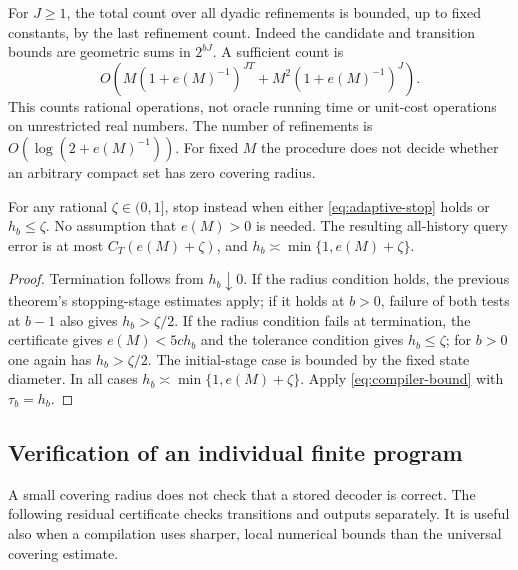 For $J\ge1$, the total count over all dyadic refinements is bounded,
up to fixed constants, by the last refinement count. Indeed the candidate
and transition bounds are geometric sums in $2^{bJ}$. A sufficient count
is
\[
 O\!\left(M(1+e(M)^{-1})^{JT}
                  +M^2(1+e(M)^{-1})^J\right).
\]
This counts rational operations, not oracle running time or unit-cost
operations on unrestricted real numbers. The number of refinements is
$O(\log(2+e(M)^{-1}))$. For fixed $M$ the procedure does not decide
whether an arbitrary compact set has zero covering radius.

\begin{corollary}
\label{cor:absolute-tolerance}
For any rational $\zeta\in(0,1]$, stop instead when either
\eqref{eq:adaptive-stop} holds or $h_b\le\zeta$. No assumption that
$e(M)>0$ is needed. The resulting all-history query error is at most
$C_T(e(M)+\zeta)$, and $h_b\asymp\min\{1,e(M)+\zeta\}$.
\end{corollary}
\begin{proof}
Termination follows from $h_b\downarrow0$. If the radius condition
holds, the previous theorem's stopping-stage estimates apply; if it
holds at $b>0$, failure of both tests at $b-1$ also gives
$h_b>\zeta/2$. If the radius condition fails at termination, the
certificate gives $e(M)<5ch_b$ and the tolerance condition gives
$h_b\le\zeta$; for $b>0$ one again has $h_b>\zeta/2$.
The initial-stage case is bounded by the fixed state diameter. In all
cases $h_b\asymp\min\{1,e(M)+\zeta\}$. Apply
\eqref{eq:compiler-bound} with $\tau_b=h_b$.
\end{proof}

\subsection{Verification of an individual finite program}
A small covering radius does not check that a stored decoder is correct.
The following residual certificate checks transitions and outputs
separately. It is useful also when a compilation uses sharper, local
numerical bounds than the universal covering estimate.

